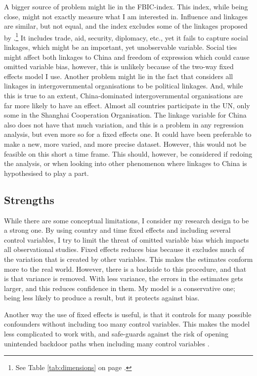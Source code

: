 A bigger source of problem might lie in the FBIC-index. This index, while being close, might not exactly measure what I am interested in. Influence and linkages are similar, but not equal, and the index excludes some of the linkages proposed by \citet{levitsky_competitive_2010}.\footnote{See Table \ref{tab:dimensions} on page \pageref{tab:dimensions}.} It includes trade, aid, security, diplomacy, etc., yet it fails to capture social linkages, which might be an important, yet unobservable variable. Social ties might affect both linkages to China and freedom of expression which could cause omitted variable bias, however, this is unlikely because of the two-way fixed effects model I use. Another problem might lie in the fact that \citep{moyer_china-us_2021} considers all linkages in intergovernmental organisations to be political linkages. And, while this is true to an extent, China-dominated intergovernmental organisations are far more likely to have an effect. Almost all countries participate in the UN, only some in the Shanghai Cooperation Organisation. The linkage variable for China also does not have that much variation, and this is a problem in any regression analysis, but even more so for a fixed effects one. It could have been preferable to make a new, more varied, and more precise dataset. However, this would not be feasible on this short a time frame. This should, however, be considered if redoing the analysis, or when looking into other phenomenon where linkages to China is hypothesised to play a part.

\subsection{Strengths}
While there are some conceptual limitations, I consider my research design to be a strong one. By using country and time fixed effects and including several control variables, I try to limit the threat of omitted variable bias which impacts all observational studies. Fixed effects reduces bias because it excludes much of the variation that is created by other variables. This makes the estimates conform more to the real world. However, there is a backside to this procedure, and that is that variance is removed. With less variance, the errors in the estimates gets larger, and this reduces confidence in them. My model is a conservative one; being less likely to produce a result, but it protects against bias. 

Another way the use of fixed effects is useful, is that it controls for many possible confounders without including too many control variables. This makes the model less complicated to work with, and safe-guards against the risk of opening unintended backdoor paths when including many control variables \citep[Chapter 3]{cunningham_causal_2021}.

